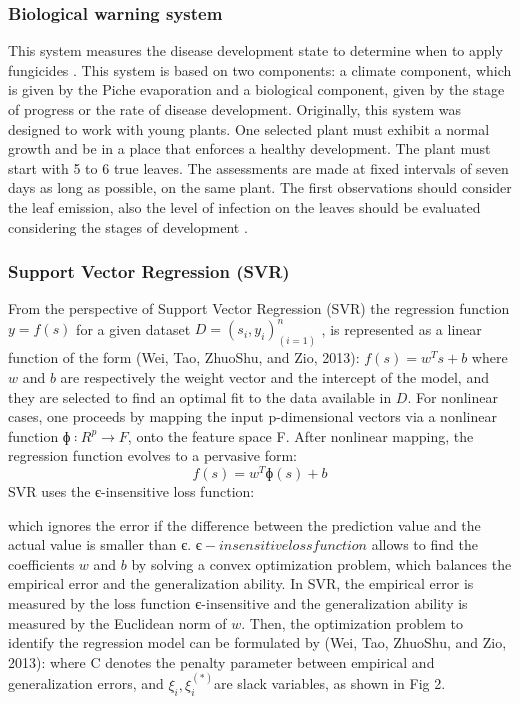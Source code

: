 \documentclass[review]{elsarticle}
\begin{document}
\subsubsection{Biological warning system}

This system measures the disease development state to determine when to
apply fungicides \citep{MarinVargas1995}.  This system is based on two
components: a climate component, which is given by the Piche
evaporation and a biological component, given by the stage of progress
or the rate of disease development. Originally, this system was
designed to work with young plants. One selected plant must exhibit a
normal growth and be in a place that enforces a healthy
development. The plant must start with 5 to 6 true leaves. The
assessments are made at fixed intervals of seven days as long as
possible, on the same plant. The first observations should consider
the leaf emission, also the level of infection on the leaves should be
evaluated considering the stages of development
\citep{MarinVargas1995}.

\subsubsection{Support Vector Regression (SVR)}
From the perspective of Support Vector Regression (SVR) the regression function $y = f(s)$ for a given dataset $D ={(s_i,y_i ) }_(i=1)^n$ , is represented as a linear function of the form (Wei, Tao, ZhuoShu, and Zio, 2013):
$f(s)=w^T s+b$
where 	$w$ and $b$ are respectively the weight vector and the intercept of the model, and they are selected to find an optimal fit to the data available in $D$.
For nonlinear cases, one proceeds by mapping the input p-dimensional vectors via a nonlinear function $ɸ∶R^p→F$, onto the feature space F.  After nonlinear mapping, the regression function evolves to a pervasive form:
$$f(s)=w^T ɸ(s)+b$$
SVR uses the є-insensitive loss function:

which ignores the error if the difference between the prediction value and the actual value is smaller than $є$.
$є-insensitive loss function$ allows to find the coefficients $w$ and $b$ by solving a convex optimization problem, which balances the empirical error and the generalization ability. In SVR, the empirical error is measured by the loss function є-insensitive and the generalization ability is measured by the Euclidean norm of $w$. Then, the optimization problem to identify the regression model can be formulated by (Wei, Tao, ZhuoShu, and Zio, 2013):
where C denotes the penalty parameter between empirical and generalization errors, and  $ξ_i,ξ_i^(* )$are slack variables, as shown in Fig 2.
 
\end{document}
